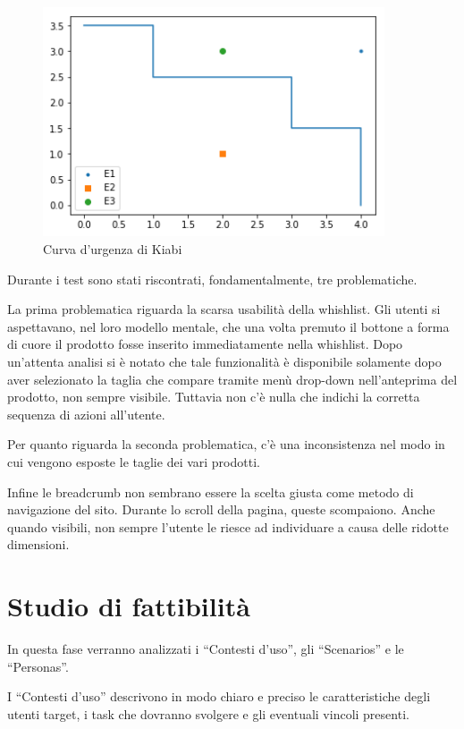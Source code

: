 \documentclass[12pt,italian,]{report}
\begin{document}
\begin{figure}[h]
\caption{Curva d'urgenza di Kiabi}
\includegraphics[width=0.90\textwidth]{img/curve_urgenza_kiabi}
\centering
\end{figure}

Durante i test sono stati riscontrati, fondamentalmente, tre problematiche.

La prima problematica riguarda la scarsa usabilità della whishlist. Gli utenti si aspettavano, nel loro modello mentale, che una volta premuto il bottone a forma di cuore il prodotto fosse inserito immediatamente nella whishlist. Dopo un'attenta analisi si è notato che tale funzionalità è disponibile solamente dopo aver selezionato la taglia che compare tramite menù drop-down nell'anteprima del prodotto, non sempre visibile. Tuttavia non c'è nulla che indichi la corretta sequenza di azioni all'utente.

Per quanto riguarda la seconda problematica, c'è una inconsistenza nel modo in cui vengono esposte le taglie dei vari prodotti.

Infine le breadcrumb non sembrano essere la scelta giusta come metodo di navigazione del sito. Durante lo scroll della pagina, queste scompaiono. Anche quando visibili, non sempre l'utente le riesce ad individuare a causa delle ridotte dimensioni.

\chapter{Studio di fattibilità}\label{studio-di-fattibilituxe0}

In questa fase verranno analizzati i ``Contesti d'uso'', gli
``Scenarios'' e le ``Personas''.

I ``Contesti d'uso'' descrivono in modo chiaro e preciso le
caratteristiche degli utenti target, i task che dovranno svolgere e
gli eventuali vincoli presenti.
\end{document}
